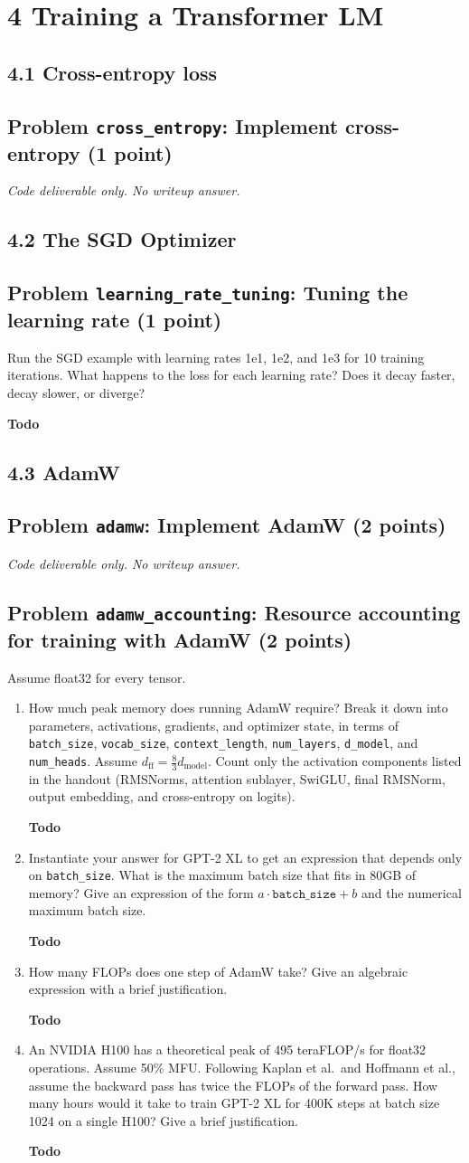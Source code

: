 \documentclass[11pt]{article}
\newcommand{\Todo}{\par\textbf{Todo}\par}
\newcommand{\CodeOnly}{\par\emph{Code deliverable only. No writeup answer.}\par}
\newcommand{\problem}[2]{%
  \subsection*{Problem \texttt{#1}: #2}%
}
\begin{document}
\section*{4 Training a Transformer LM}

\subsection*{4.1 Cross-entropy loss}

\problem{cross\_entropy}{Implement cross-entropy (1 point)}

\CodeOnly

\subsection*{4.2 The SGD Optimizer}

\problem{learning\_rate\_tuning}{Tuning the learning rate (1 point)}

Run the SGD example with learning rates 1e1, 1e2, and 1e3 for 10 training iterations. What happens to the loss for each learning rate? Does it decay faster, decay slower, or diverge?
\Todo

\subsection*{4.3 AdamW}

\problem{adamw}{Implement AdamW (2 points)}

\CodeOnly

\problem{adamw\_accounting}{Resource accounting for training with AdamW (2 points)}

Assume float32 for every tensor.

\begin{enumerate}[label=(\alph*)]
  \item How much peak memory does running AdamW require? Break it down into parameters, activations, gradients, and optimizer state, in terms of \texttt{batch\_size}, \texttt{vocab\_size}, \texttt{context\_length}, \texttt{num\_layers}, \texttt{d\_model}, and \texttt{num\_heads}. Assume $d_{\text{ff}} = \frac{8}{3} d_{\text{model}}$. Count only the activation components listed in the handout (RMSNorms, attention sublayer, SwiGLU, final RMSNorm, output embedding, and cross-entropy on logits).
  \Todo
  \item Instantiate your answer for GPT-2 XL to get an expression that depends only on \texttt{batch\_size}. What is the maximum batch size that fits in 80GB of memory? Give an expression of the form $a \cdot \texttt{batch\_size} + b$ and the numerical maximum batch size.
  \Todo
  \item How many FLOPs does one step of AdamW take? Give an algebraic expression with a brief justification.
  \Todo
  \item An NVIDIA H100 has a theoretical peak of 495 teraFLOP/s for float32 operations. Assume 50\% MFU. Following Kaplan et al.\ and Hoffmann et al., assume the backward pass has twice the FLOPs of the forward pass. How many hours would it take to train GPT-2 XL for 400K steps at batch size 1024 on a single H100? Give a brief justification.
  \Todo
\end{enumerate}
\end{document}
